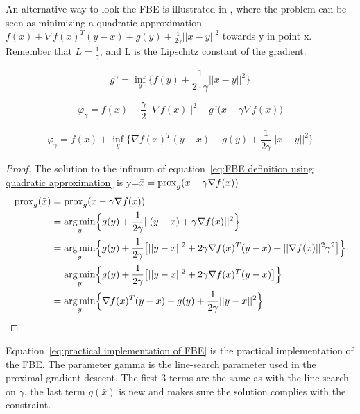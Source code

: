 		An alternative way to look the FBE is illustrated in \cite{AjaySathya2017}, where the problem can be seen as minimizing a quadratic approximation  $f(x) +  \nabla f(x)^T(y-x) + g(y) + \frac{1}{2 \gamma} ||x-y||^2  $ towards y in point x.  Remember that $L = \frac{1}{\gamma}$, and L is the Lipschitz constant of the gradient.
		
		\begin{equation}
			g^{\gamma} = \underset{y}{\inf} \big \{f(y)+\frac{1}{2 \cdot \gamma}||x-y||^2 \big \}
			\label{eq:Moreau envelope}
		\end{equation}
		
		\begin{equation}
		\varphi_{\gamma} = f(x) - \frac{\gamma}{2}||\nabla f(x)||^2 + g^{\gamma} \big(x-\gamma \nabla f(x) \big)
		\label{eq:FBE definition using Moreau envelope}
		\end{equation}
		
		\begin{equation}
		\varphi_{\gamma} =   f(x) + \underset{y}{\inf} \Big\{ \nabla f(x)^T(y-x) + g(y) + \frac{1}{2 \gamma} ||x-y||^2  \Big\}
		\label{eq:FBE definition using quadratic approximation}
		\end{equation}
		
		\begin{proof}
			The solution to the infimum of equation~\ref{eq:FBE definition using quadratic approximation} is y=$\bar{x}= \operatorname{prox}_g(x-\gamma \nabla f(x))$
			\begin{align*}
			\operatorname{prox}_g(\bar{x}) 
			&=\operatorname{prox}_g(x- \gamma \nabla f(x)) \\
			&= \underset{y}{\operatorname*{arg\,min}} \Big \{ g(y) 
			+ \frac{1}{2 \gamma}||(y-x) + \gamma \nabla f(x)||^2 \Big \} \\
			&= \underset{y}{\operatorname*{arg\,min}} \Big \{ g(y) 
			+ \frac{1}{2 \gamma} \big[||y-x||^2 + 2 \gamma \nabla f(x)^T(y-x) + ||\nabla f(x)||^2\gamma^2 \big] \Big \} \\
			&= \underset{y}{\operatorname*{arg\,min}} \Big \{ g(y) 
			+ \frac{1}{2 \gamma} \big[||y-x||^2 + 2 \gamma \nabla f(x)^T(y-x)  \big] \Big \}\\
			&= \underset{y}{\operatorname*{arg\,min}} \Big \{   \nabla f(x)^T(y-x)  + g(y) 
			+ \frac{1}{2 \gamma} ||y-x||^2  \Big  \}
			\end{align*}
			\label{prf:prox is solution to FBE inf}
		\end{proof}
		
		Equation~\ref{eq:practical implementation of FBE} is the practical implementation of the FBE. The parameter gamma is the line-search parameter used in the proximal gradient descent. The first 3 terms are the same as with the line-search on $\gamma$, the last term $g(\bar{x})$ is new and makes sure the solution complies with the constraint.
		
